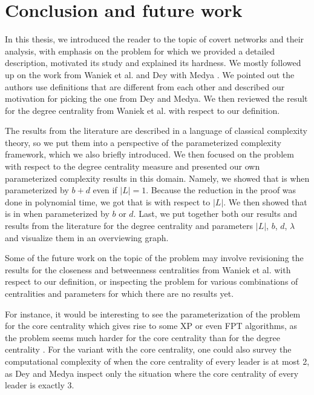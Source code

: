\chapter{Conclusion and future work}

In this thesis, we introduced the reader to the topic of covert networks and their analysis,
with emphasis on the \HL problem for which we provided a detailed description, motivated its study
and explained its hardness.
We mostly followed up on the work from Waniek et al. and Dey with Medya \cite{Waniek2017,Dey2019}.
We pointed out the authors use definitions that are different from each other and described our motivation
for picking the one from Dey and Medya.
We then reviewed the result for the degree centrality from Waniek et al. with respect to our definition.

The results from the literature are described in a language of classical complexity theory,
so we put them into a perspective of the parameterized complexity framework, which we also briefly introduced.
We then focused on the problem with respect to the degree centrality measure
and presented our own parameterized complexity results in this domain.
Namely, we showed that \HL is \Wh when parameterized by $b+d$ even if $|L| = 1$.
Because the reduction in the proof was done in polynomial time,
we got that \HLshort is \pNPh with respect to $|L|$.
We then showed that \HLshort is in \XP when parameterized by $b$ or $d$.
Last, we put together both our results and results from the literature for the degree centrality
and parameters $|L|$, $b$, $d$, $\lambda$ and visualize them in an overviewing graph.

Some of the future work on the topic of the \HL problem may involve
revisioning the results for the closeness and betweenness centralities from Waniek et al. \cite{Waniek2021full}
with respect to our definition,
or inspecting the problem for various combinations of centralities and parameters for which there are no results yet.

For instance, it would be interesting to see the parameterization of the problem for the core centrality
which gives rise to some XP or even FPT algorithms,
as the problem seems much harder for the core centrality than for the degree centrality \cite{Dey2019}.
For the variant with the core centrality, one could also survey the computational complexity of \HLshort
when the core centrality of every leader is at most 2,
as Dey and Medya \cite{Dey2019} inspect only the situation where the core centrality of every leader is exactly 3.

